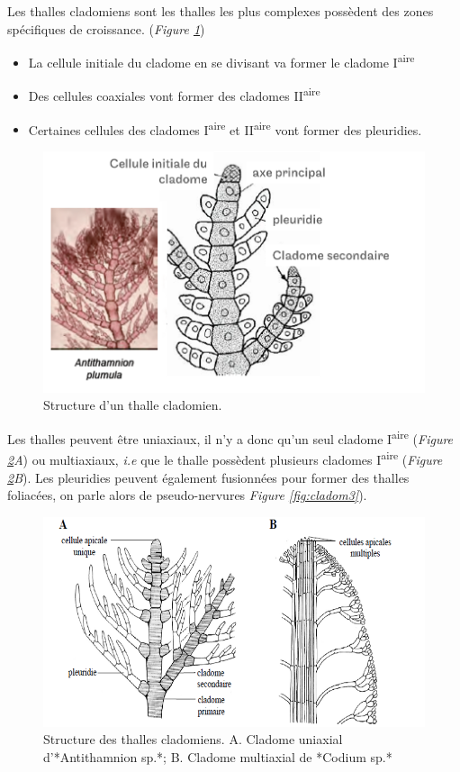 \documentclass[
]{book}
\providecommand{\tightlist}{%
  \setlength{\itemsep}{0pt}\setlength{\parskip}{0pt}}
\begin{document}
Les thalles cladomiens sont les thalles les plus complexes possèdent des zones spécifiques de croissance.
(\emph{Figure \ref{fig:cladom1}})

\begin{itemize}
\tightlist
\item
  La cellule initiale du cladome en se divisant va former le cladome I\textsuperscript{aire}
\item
  Des cellules coaxiales vont former des cladomes II\textsuperscript{aire}
\item
  Certaines cellules des cladomes I\textsuperscript{aire} et II\textsuperscript{aire} vont former des pleuridies.
\end{itemize}

\begin{figure}[H]

{\centering \includegraphics[width=0.7\linewidth]{./images/cladom1} 

}

\caption{Structure d'un thalle cladomien.}\label{fig:cladom1}
\end{figure}

Les thalles peuvent être uniaxiaux, il n'y a donc qu'un seul cladome I\textsuperscript{aire} (\emph{Figure \ref{fig:cladom2}A}) ou multiaxiaux, \emph{i.e} que le thalle possèdent plusieurs cladomes I\textsuperscript{aire} (\emph{Figure \ref{fig:cladom2}B}). Les pleuridies peuvent également fusionnées pour former des thalles foliacées, on parle alors de pseudo-nervures \emph{Figure \ref{fig:cladom3}}).

\begin{figure}[H]

{\centering \includegraphics[width=0.7\linewidth]{./images/cladom2} 

}

\caption{Structure des thalles cladomiens. A. Cladome uniaxial d'*Antithamnion sp.*; B. Cladome multiaxial de *Codium sp.*}\label{fig:cladom2}
\end{figure}
\end{document}
